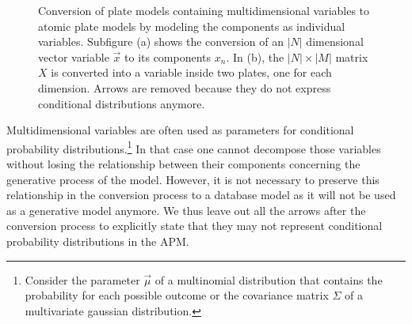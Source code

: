 \begin{figure}[t]
\centering
\scalebox{\tikzScale}{\adjustTikzSize }
\caption{Conversion of plate models containing multidimensional variables to atomic plate models by modeling the components as individual variables. Subfigure (a) shows the conversion of an $|N|$ dimensional vector variable $\vec x$ to its components $x_n$. In (b), the $|N| \times |M|$ matrix $X$ is converted into a variable inside two plates, one for each dimension. Arrows are removed because they do not express conditional distributions anymore.}\label{fig:pm2apm}
\end{figure}


Multidimensional variables are often used as parameters for conditional probability distributions.\footnote{Consider the parameter $\vec \mu$ of a multinomial distribution that contains the probability for each possible outcome or the covariance matrix $\Sigma$ of a multivariate gaussian distribution.} In that case one cannot decompose those variables without losing the relationship between their components concerning the generative process of the model. However, it is not necessary to preserve this relationship in the conversion process to a database model as it will not be used as a generative model anymore. We thus leave out all the arrows after the conversion process to explicitly state that they may not represent conditional probability distributions in the APM.

